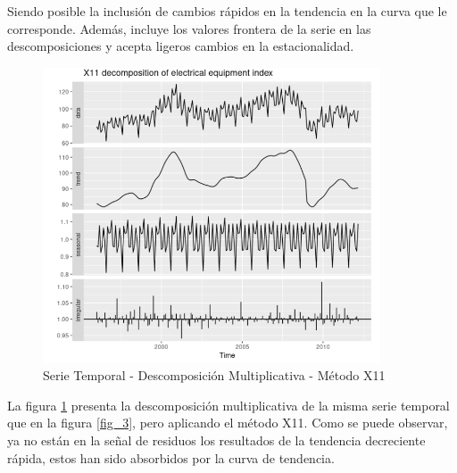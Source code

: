 \documentclass{article}
\begin{document}
        Siendo posible la inclusión de cambios rápidos en la tendencia en la curva que le corresponde. Además, incluye los valores frontera de la serie en las descomposiciones y acepta ligeros cambios en la estacionalidad. \newpage
	\begin{figure}[h]
		\centering
                \label{fig_4}
                \includegraphics[width=10cm]{Ejemplo_ST_descomposicion_X11}
		\caption{Serie Temporal - Descomposición Multiplicativa - Método X11}
	\end{figure} 

        La figura \ref{fig_4} presenta la descomposición multiplicativa de la misma serie temporal que en la figura \ref{fig_3}, pero aplicando el método X11. Como se puede observar, ya no están en la señal de residuos los resultados de la tendencia decreciente rápida, estos han sido absorbidos por la curva de tendencia.
\end{document}
